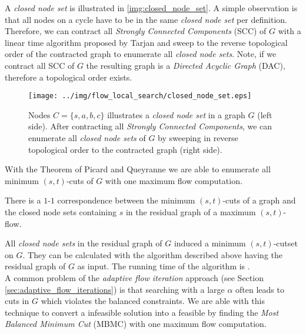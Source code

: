 A \emph{closed node set} is illustrated in \autoref{img:closed_node_set}. A simple observation
is that all nodes on a cycle have to be in the same \emph{closed node set} per definition. Therefore,
we can contract all \emph{Strongly Connected Components} (SCC) of $G$ with a linear time algorithm
proposed by Tarjan \cite{tarjan1972depth} and sweep to the reverse
topological order of the contracted graph to enumerate all \emph{closed node sets}. Note, if
we contract all SCC of $G$ the resulting graph is a \emph{Directed Acyclic Graph} (DAC), therefore 
a topological order exists.
\begin{figure}
\centering
\texttt{[image: ../img/flow\_local\_search/closed\_node\_set.eps]}
\caption{Nodes $C = \{s,a,b,c\}$ illustrates a \emph{closed node set} in a graph $G$ (left side).
         After contracting all \emph{Strongly Connected Components}, we can enumerate all
         \emph{closed node sets} of $G$ by sweeping in reverse topological order to the
         contracted graph (right side).}
\label{img:closed_node_set}
\end{figure}
With the Theorem of Picard and Queyranne \cite{picard1980structure} we are able to enumerate
all minimum $(s,t)$-cuts of $G$ with one maximum flow computation.

\begin{theorem}
\label{theorem:mbmc}
There is a $1$-$1$ correspondence between the minimum $(s,t)$-cuts of a graph and the closed node
sets containing $s$ in the residual graph of a maximum $(s,t)$-flow.
\end{theorem}

All \emph{closed node sets} in the residual graph of $G$ induced a minimum $(s,t)$-cutset on $G$.
They can be calculated with the algorithm described above having the residual graph of
$G$ as input. The running time of the algorithm is . \\
A common problem of the \emph{adaptive flow iteration} approach (see Section \ref{sec:adaptive_flow_iterations}) is
that searching with a large $\alpha$ often leads to cuts in $G$ which violates the balanced constraints. 
We are able with this technique to convert a infeasible solution into a feasible by finding
the \emph{Most Balanced Minimum Cut} (MBMC) with one maximum flow computation.


